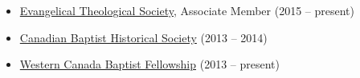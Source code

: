 
\begin{itemize}
\item \href{http://www.etsjets.org/}{Evangelical Theological Society}, Associate Member (2015 -- present)
\item \href{https://www.facebook.com/canadianbaptisthistory}{Canadian Baptist Historical Society} (2013 -- 2014)
\item \href{http://wcbf.net/}{Western Canada Baptist Fellowship} (2013 -- present)
\end{itemize}

